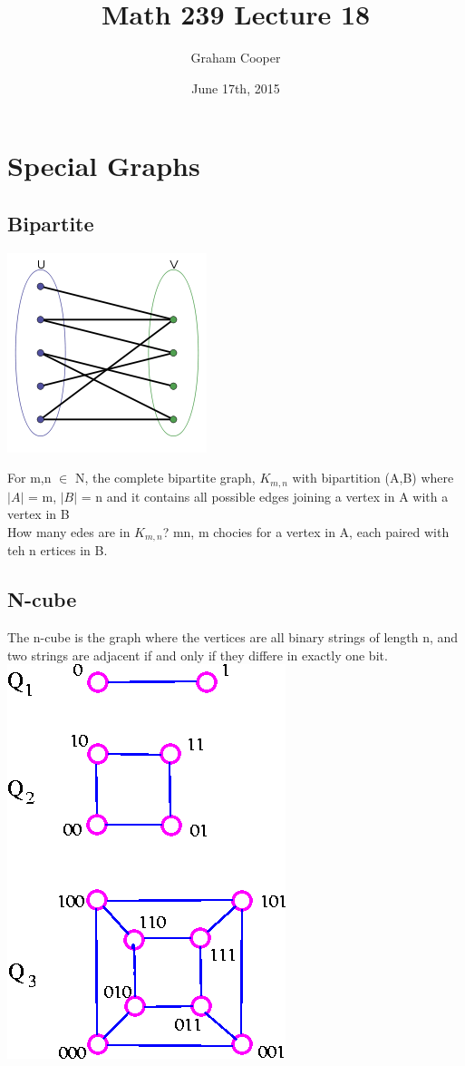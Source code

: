 \documentclass[12pt]{article}
\title{\vspace{-15ex}Math 239 Lecture 18\vspace{-1ex}}
\date{June 17th, 2015}
\author{Graham Cooper}
\begin{document}
	\maketitle
	
	\section*{Special Graphs}
	\subsection*{Bipartite}
	
	\includegraphics[scale=0.5]{bipartite.png}
	
	For m,n $\in$ N, the complete bipartite graph, $K_{m,n}$ with bipartition (A,B) where $|A|$ = m, $|B|$ = n and it contains all possible edges joining a vertex in A with a vertex in B\\
	
	How many edes are in $K_{m,n}$? mn, m chocies for a vertex in A, each paired with teh n ertices in B.\\
	
	\subsection*{N-cube}
	The n-cube is the graph where the vertices are all binary strings of length n, and two strings are adjacent if and only if they differe in exactly one bit.\\
	
	\includegraphics[scale=0.5]{n-cube.png}
	
\end{document}
